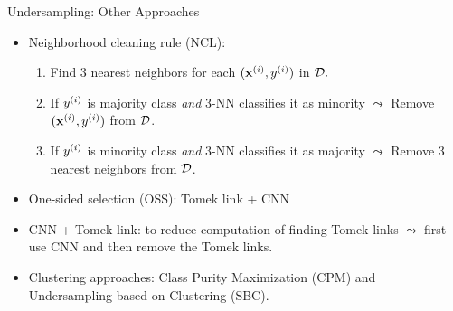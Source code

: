 \documentclass[11pt,compress,t,notes=noshow, xcolor=table]{beamer}
\begin{document}
\begin{frame}{Undersampling: Other Approaches}

    \begin{itemize}

        \item Neighborhood cleaning rule (NCL):
    
        \begin{enumerate}
            
            \item Find 3 nearest neighbors for each $(\mathbf{x}^{(i)},y^{(i)})$ in $\mathcal{D}.$
        
            \item If $y^{(i)}$ is majority class \emph{and} 3-NN classifies it as minority $\leadsto$ Remove $(\mathbf{x}^{(i)},y^{(i)})$ from $\mathcal{D}$.
        
            \item If $y^{(i)}$ is minority class \emph{and} 3-NN classifies it as majority $\leadsto$ Remove 3 nearest neighbors from $\mathcal{D}$.
        
        \end{enumerate} 
    
        \item One-sided selection (OSS): Tomek link + CNN

        \item CNN + Tomek link: to reduce computation of finding Tomek links $\leadsto$ first use CNN and then remove the Tomek links.
    
        \item Clustering approaches: Class Purity Maximization (CPM) and Undersampling based on Clustering (SBC).

    \end{itemize}

\end{frame}
	



\end{document}
